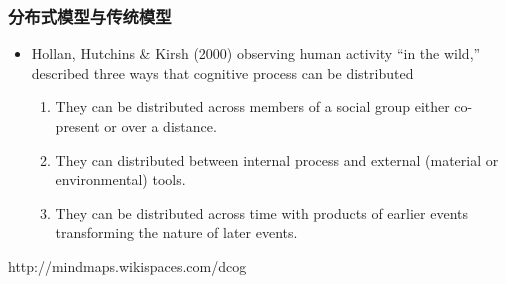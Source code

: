 \documentclass{beamer}
\begin{document}
\begin{frame}
	\frametitle{分布式模型与传统模型}
	\begin{itemize}
		\item Hollan, Hutchins \& Kirsh (2000) observing human activity ``in the wild,'' described three ways that cognitive process can be distributed
		\begin{enumerate}
			\item They can be distributed across members of a social group either co-present or over a distance.
			\item They can distributed between internal process and external (material or environmental) tools.
			\item They can be distributed across time with products of earlier events transforming the nature of later events.
		\end{enumerate}
	\end{itemize}
    \begin{flushright}
    	{\tiny http://mindmaps.wikispaces.com/dcog}
   	\end{flushright}
\end{frame}

{
\frame[plain]{\transdissolve}
}
\end{document}
